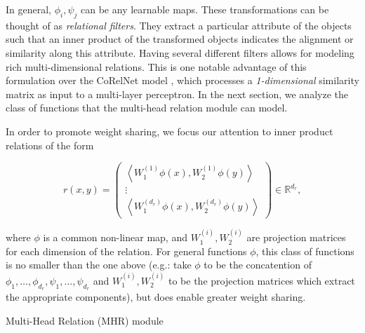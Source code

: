 In general, $\phi_i, \psi_j$ can be any learnable maps. These transformations can be thought of as \textit{relational filters}. They extract a particular attribute of the objects such that an inner product of the transformed objects indicates the alignment or similarity along this attribute. Having several different filters allows for modeling rich multi-dimensional relations. This is one notable advantage of this formulation over the CoRelNet model \citep{kerg2022neural}, which processes a \textit{1-dimensional} similarity matrix as input to a multi-layer perceptron. In the next section, we analyze the class of functions that the multi-head relation module can model.

In order to promote weight sharing, we focus our attention to inner product relations of the form

\begin{equation}\label{eq:inner_prod_rel_weight_sharing}
    r(x,y) = \begin{pmatrix} \left\langle W_1^{(1)}\phi(x), W_2^{(1)} \phi(y) \right\rangle \\  \vdots \\ \left\langle W_1^{(d_r)}\phi(x), W_2^{(d_r)} \phi(y) \right\rangle \end{pmatrix} \in \mathbb{R}^{d_r},
\end{equation}

where $\phi$ is a common non-linear map, and $W_1^{(i)}, W_2^{(i)}$ are projection matrices for each dimension of the relation. For general functions $\phi$, this class of functions is no smaller than the one above (e.g.: take $\phi$ to be the concatention of $\phi_1, \ldots, \phi_{d_r}, \psi_1, \ldots, \psi_{d_r}$ and $W_1^{(i)}, W_2^{(i)}$ to be the projection matrices which extract the appropriate components), but does enable greater weight sharing.

\begin{algorithm}[ht!]
	\caption{Multi-Head Relation (MHR) module}\label{alg:multiheadrelation}

	\vspace{1em}

\end{algorithm}

